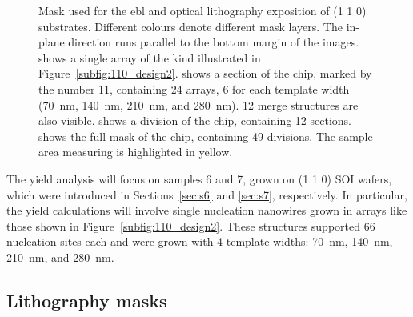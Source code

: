 \begin{figure}
{
    }
    \caption[Mask used for the \acs{ebl} and optical lithography exposition of \hkl(1 1 0) substrtates.]{Mask used for the \acs{ebl} and optical lithography exposition of \hkl(1 1 0) substrates. Different colours denote different mask layers. The in-plane  direction runs parallel to the bottom margin of the images.  shows a single array of the kind illustrated in Figure~\ref{subfig:110_design2}.  shows a section of the chip, marked by the number 11, containing \num{24} arrays, \num{6} for each template width (\qty{70}{nm}, \qty{140}{nm}, \qty{210}{nm}, and \qty{280}{nm}). \num{12} merge structures are also visible.  shows a division of the chip, containing \num{12} sections.  shows the full mask of the chip, containing \num{49} divisions. The sample area measuring  is highlighted in yellow.}
    \label{fig:wafer_mask}
\end{figure}

The yield analysis will focus on samples \num{6} and \num{7}, grown on \hkl(1 1 0) \acs{SOI} wafers, which were introduced in Sections~\ref{sec:s6} and \ref{sec:s7}, respectively. In particular, the yield calculations will involve single nucleation nanowires grown in arrays like those shown in Figure~\ref{subfig:110_design2}. These structures supported \num{66} nucleation sites each and were grown with 4 template widths: \qty{70}{nm}, \qty{140}{nm}, \qty{210}{nm}, and \qty{280}{nm}.

\subsection{Lithography masks}

